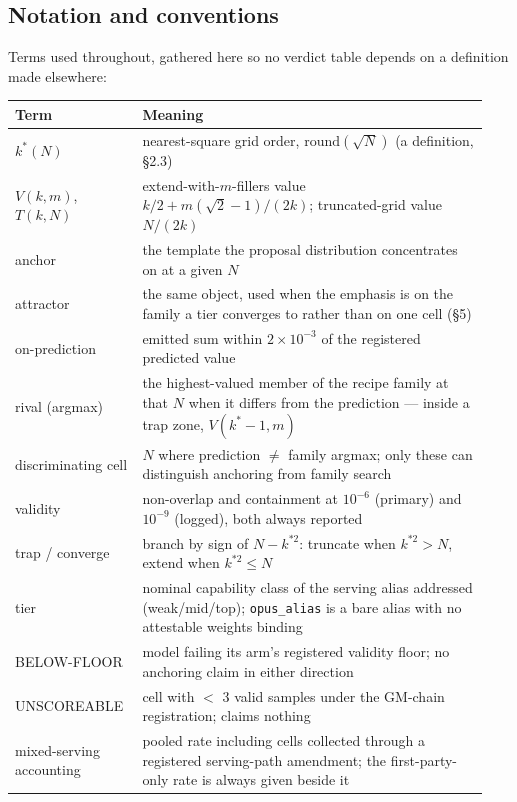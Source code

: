\subsection{Notation and conventions}

Terms used throughout, gathered here so no verdict table depends on a definition made elsewhere:

\begin{center}
\begin{footnotesize}
\begin{tabular}{@{}p{0.24\linewidth}p{0.70\linewidth}@{}}
\toprule
Term & Meaning \\
\midrule
$k^*(N)$ & nearest-square grid order, $\mathrm{round}(\sqrt{N})$ (a definition, \S2.3) \\
$V(k, m)$, $T(k, N)$ & extend-with-$m$-fillers value $k/2 + m(\sqrt{2}-1)/(2k)$; truncated-grid value $N/(2k)$ \\
anchor & the template the proposal distribution concentrates on at a given $N$ \\
attractor & the same object, used when the emphasis is on the family a tier converges to rather than on one cell (\S5) \\
on-prediction & emitted sum within $2\times10^{-3}$ of the registered predicted value \\
rival (argmax) & the highest-valued member of the recipe family at that $N$ when it differs from the prediction --- inside a trap zone, $V(k^*{-}1, m)$ \\
discriminating cell & $N$ where prediction $\ne$ family argmax; only these can distinguish anchoring from family search \\
validity & non-overlap and containment at $10^{-6}$ (primary) and $10^{-9}$ (logged), both always reported \\
trap / converge & branch by sign of $N - k^{*2}$: truncate when $k^{*2} > N$, extend when $k^{*2} \le N$ \\
tier & nominal capability class of the serving alias addressed (weak/mid/top); \texttt{opus\_alias} is a bare alias with no attestable weights binding \\
BELOW-FLOOR & model failing its arm's registered validity floor; no anchoring claim in either direction \\
UNSCOREABLE & cell with $<$ 3 valid samples under the GM-chain registration; claims nothing \\
mixed-serving accounting & pooled rate including cells collected through a registered serving-path amendment; the first-party-only rate is always given beside it \\
\bottomrule
\end{tabular}
\end{footnotesize}
\end{center}
